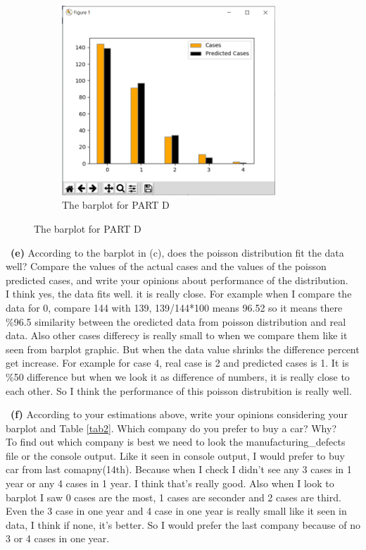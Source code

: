 \documentclass[a4 paper]{article}
\numberwithin{equation}{section}
\newcommand{\subproblem}[1]{~\newline\textbf{(#1)}}
\newcommand{\0}{\mathbf{0}}
\begin{document}
    \begin{figure}[h!]
    	\begin{subfigure}[h]{1\textwidth}
    		\centering
    		\includegraphics[height=2.8in]{barplot.png}
    		\caption{The barplot for PART D}
    	\end{subfigure}
    \end{figure}
	
	
	\subproblem{e} According to the barplot in (c), does the poisson distribution fit the data well? Compare the values of the actual cases and the values of the poisson predicted cases, and write your opinions about performance of the distribution.\\
	
	
    I think yes, the data fits well. it is really close. For example when I compare the data for 0, compare 144 with 139, 139/144*100 means 96.52 so it means there \%96.5 similarity between the oredicted data from poisson distribution and real data. Also other cases differecy is really small to when we compare them like it seen from barplot graphic. But when the data value shrinks the difference percent get increase. For example for case 4, real case is 2 and predicted cases is 1. It is \%50 difference but when we look it as difference of numbers, it is really close to each other. So I think the performance of this poisson distrubition is really well.
    

	\newpage
	\subproblem{f} According to your estimations above, write your opinions considering your barplot and Table \ref{tab2}. Which company do you prefer to buy a car? Why?\\
	
	To find out which company is best we need to look the manufacturing\_defects file or the console output. Like it seen in console output, I would prefer to buy car from last comapny(14th). Because when I check I didn't see any 3 cases in 1 year  or any 4 cases in 1 year. I think that's really good. Also when I look to barplot I saw 0 cases are the most, 1 cases are seconder and 2 cases are third. Even the 3 case in one year and 4 case in one year is really small like it seen in data, I think if none, it's better. So I would prefer the last company because of no 3 or 4 cases in one year.
	
\end{document}
